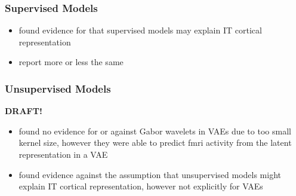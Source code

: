 \subsubsection{Supervised Models}
\begin{itemize}
    \item \citet{khaligh2014deep} found evidence for that supervised models may explain \ac{IT} cortical representation
    \item \citet{cadieu2014deep} report more or less the same
\end{itemize}

\subsubsection{Unsupervised Models}
\textbf{DRAFT!}
\begin{itemize}
    \item \citet{han2019variational} found no evidence for or against Gabor wavelets in \acp{VAE} due to too small kernel size, however they were able to predict fmri activity from the latent representation in a VAE
    \item \citet{khaligh2014deep} found evidence against the assumption that unsupervised models might explain \ac{IT} cortical representation, however not explicitly for \acp{VAE}
\end{itemize}